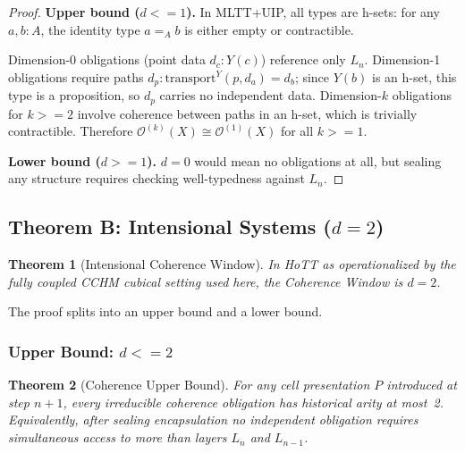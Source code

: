 \documentclass[11pt,a4paper]{article}
\def\leq{<=}%
\def\geq{>=}%
\theoremstyle{plain}
\newtheorem{theorem}{Theorem}[section]
\theoremstyle{definition}
\theoremstyle{remark}
\begin{document}
\begin{proof}
\textbf{Upper bound ($d \leq 1$).}
In MLTT+UIP, all types are h-sets: for any $a, b : A$, the identity type $a =_A b$ is either empty or contractible.

Dimension-0 obligations (point data $d_c : Y(c)$) reference only $L_n$.
Dimension-1 obligations require paths $d_p : \mathrm{transport}^Y(p, d_a) = d_b$; since $Y(b)$ is an h-set, this type is a proposition, so $d_p$ carries no independent data.
Dimension-$k$ obligations for $k \geq 2$ involve coherence between paths in an h-set, which is trivially contractible.
Therefore $\mathcal{O}^{(k)}(X) \cong \mathcal{O}^{(1)}(X)$ for all $k \geq 1$.

\medskip\noindent\textbf{Lower bound ($d \geq 1$).}
$d = 0$ would mean no obligations at all, but sealing any structure requires checking well-typedness against $L_n$.
\end{proof}

\subsection{\texorpdfstring{Theorem B: Intensional Systems ($d = 2$)}{Theorem B: Intensional Systems (d = 2)}}

\begin{theorem}[Intensional Coherence Window]
\label{thm:int-window}
In HoTT as operationalized by the fully coupled CCHM cubical setting used here, the Coherence Window is $d = 2$.
\end{theorem}

The proof splits into an upper bound and a lower bound.

\subsubsection{\texorpdfstring{Upper Bound: $d \leq 2$}{Upper Bound: d <= 2}}

\begin{theorem}[Coherence Upper Bound]
\label{thm:upper}
For any cell presentation $P$ introduced at step $n+1$, every irreducible coherence obligation has historical arity at most~2.
Equivalently, after sealing encapsulation no independent obligation requires simultaneous access to more than layers $L_n$ and $L_{n-1}$.
\end{theorem}
\end{document}
